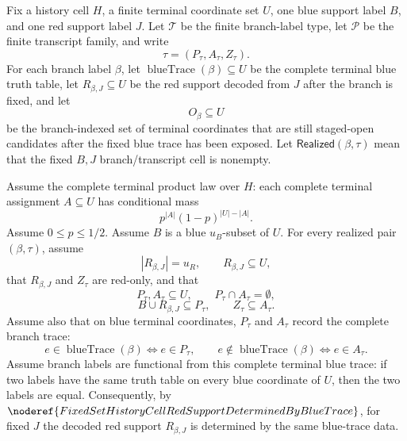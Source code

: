 \begin{helper}
Fix a history cell \(H\), a finite terminal coordinate set \(U\), one blue
support label \(B\), and one red support label \(J\).  Let \(\mathcal T\) be
the finite branch-label type, let \(\mathcal P\) be the finite transcript
family, and write
\[
\tau=(P_\tau,A_\tau,Z_\tau).
\]
For each branch label \(\beta\), let
\(\operatorname{blueTrace}(\beta)\subseteq U\) be the complete terminal blue
truth table, let \(R_{\beta,J}\subseteq U\) be the red support decoded from
\(J\) after the branch is fixed, and let
\[
O_\beta\subseteq U
\]
be the branch-indexed set of terminal coordinates that are still
staged-open candidates after the fixed blue trace has been exposed.  Let
\(\mathsf{Realized}(\beta,\tau)\) mean that the fixed \(B,J\)
branch/transcript cell is nonempty.

Assume the complete terminal product law over \(H\): each complete terminal
assignment \(A\subseteq U\) has conditional mass
\[
p^{|A|}(1-p)^{|U|-|A|}.
\]
Assume \(0\le p\le1/2\).  Assume \(B\) is a blue \(u_B\)-subset of \(U\).
For every realized pair \((\beta,\tau)\), assume
\[
|R_{\beta,J}|=u_R,\qquad R_{\beta,J}\subseteq U,
\]
that \(R_{\beta,J}\) and \(Z_\tau\) are red-only, and that
\[
P_\tau,A_\tau\subseteq U,\qquad P_\tau\cap A_\tau=\emptyset,
\]
\[
B\cup R_{\beta,J}\subseteq P_\tau,\qquad
Z_\tau\subseteq A_\tau.
\]
Assume also that on blue terminal coordinates, \(P_\tau\) and \(A_\tau\)
record the complete branch trace:
\[
e\in\operatorname{blueTrace}(\beta)\Longleftrightarrow e\in P_\tau,
\qquad
e\notin\operatorname{blueTrace}(\beta)\Longleftrightarrow e\in A_\tau .
\]
Assume branch labels are functional from this complete terminal blue trace:
if two labels have the same truth table on every blue coordinate of \(U\),
then the two labels are equal.  Consequently, by
\(\noderef{FixedSetHistoryCellRedSupportDeterminedByBlueTrace}\), for fixed
\(J\) the decoded red support \(R_{\beta,J}\) is determined by the same
blue-trace data.


\end{helper}
